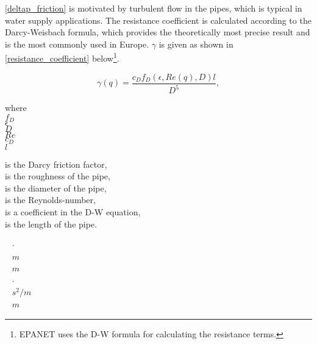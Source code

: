 \eqref{deltap_friction} is motivated by turbulent flow in the pipes, which is typical in water supply applications. The resistance coefficient is calculated according to the Darcy-Weisbach formula, which provides the theoretically most precise result and is the most commonly used in Europe\cite{prahata,agency2016epanet}. $\gamma$ is given as shown in \eqref{resistance_coefficient} below\footnote{EPANET uses the D-W formula for calculating the resistance terms.}.  

\begin{equation}
  \label{resistance_coefficient}
  \gamma(q) = \frac{c_D f_{D}(\epsilon,Re(q), D )l}{D^{5}},
\end{equation}

 \begin{minipage}[t]{0.20\textwidth}
where\\
\hspace*{8mm} $f_{D}$ \\
\hspace*{8mm} $\epsilon$ \\
\hspace*{8mm} $D$ \\
\hspace*{8mm} $Re$ \\
\hspace*{8mm} $c_D$ \\
\hspace*{8mm} $l$ 
\end{minipage}
\begin{minipage}[t]{0.68\textwidth}
\vspace*{2mm}
is the Darcy friction factor,  \\
is the roughness of the pipe,  \\
is the diameter of the pipe,  \\
is the Reynolds-number,  \\
is a coefficient in the D-W equation,  \\
is the length of the pipe.
\end{minipage}
\begin{minipage}[t]{0.10\textwidth}
\vspace*{2mm}
\textcolor{White}{te}$\unit{\cdot}$\\
\textcolor{White}{te}$\unit{m}$\\
\textcolor{White}{te}$\unit{m}$ \\
\textcolor{White}{te}$\unit{\cdot}$ \\
\textcolor{White}{te}$\unit{s^2/m}$ \\
\textcolor{White}{te}$\unit{m}$
\end{minipage}

